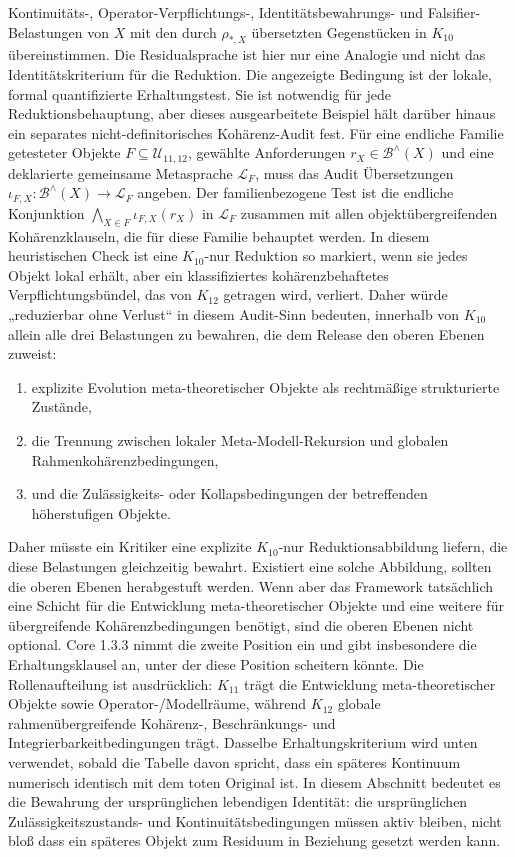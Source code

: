 Kontinuitäts-, Operator-Verpflichtungs-, Identitätsbewahrungs- und Falsifier-Belastungen von \(X\) mit den
durch \(\rho_{\ast,X}\) übersetzten Gegenstücken in \(K_{10}\) übereinstimmen. Die Residualsprache ist hier
nur eine Analogie und nicht das Identitätskriterium für die Reduktion. Die angezeigte Bedingung ist der
lokale, formal quantifizierte Erhaltungstest. Sie ist notwendig für jede Reduktionsbehauptung, aber dieses
ausgearbeitete Beispiel hält darüber hinaus ein separates nicht-definitorisches Kohärenz-Audit fest. Für eine
endliche Familie getesteter Objekte \(F\subseteq\mathcal{U}_{11,12}\), gewählte Anforderungen
\(r_X\in\mathcal{B}^{\wedge}(X)\) und eine deklarierte gemeinsame Metasprache \(\mathcal{L}_F\), muss das
Audit Übersetzungen\(\iota_{F,X}:
\mathcal{B}^{\wedge}(X)\to\mathcal{L}_F\)
angeben. Der familienbezogene Test ist die endliche Konjunktion
\(\bigwedge_{X\in F}\iota_{F,X}(r_X)\) in \(\mathcal{L}_F\) zusammen mit allen
objektübergreifenden Kohärenzklauseln, die für diese Familie behauptet werden. In diesem heuristischen
Check ist eine \(K_{10}\)-nur Reduktion so markiert, wenn sie jedes Objekt lokal erhält, aber ein
klassifiziertes kohärenzbehaftetes Verpflichtungsbündel, das von \(K_{12}\) getragen wird, verliert. Daher
würde „reduzierbar ohne Verlust“ in diesem Audit-Sinn bedeuten, innerhalb von \(K_{10}\) allein alle drei
Belastungen zu bewahren, die dem Release den oberen Ebenen zuweist:
\begin{enumerate}
\item explizite Evolution meta-theoretischer Objekte als rechtmäßige strukturierte Zustände,
\item die Trennung zwischen lokaler Meta-Modell-Rekursion und globalen Rahmenkohärenzbedingungen,
\item und die Zulässigkeits- oder Kollapsbedingungen der betreffenden höherstufigen Objekte.
\end{enumerate}
Daher müsste ein Kritiker eine explizite \(K_{10}\)-nur Reduktionsabbildung liefern, die diese Belastungen
gleichzeitig bewahrt. Existiert eine solche Abbildung, sollten die oberen Ebenen herabgestuft werden. Wenn
aber das Framework tatsächlich eine Schicht für die Entwicklung meta-theoretischer Objekte und eine weitere
für übergreifende Kohärenzbedingungen benötigt, sind die oberen Ebenen nicht optional. Core 1.3.3 nimmt die
zweite Position ein und gibt insbesondere die Erhaltungsklausel an, unter der diese Position scheitern
könnte.
Die Rollenaufteilung ist ausdrücklich: \(K_{11}\) trägt die Entwicklung meta-theoretischer Objekte sowie
Operator-/Modellräume, während \(K_{12}\) globale rahmenübergreifende Kohärenz-, Beschränkungs- und
Integrierbarkeitbedingungen trägt. Dasselbe Erhaltungskriterium wird unten verwendet, sobald die Tabelle
davon spricht, dass ein späteres Kontinuum numerisch identisch mit dem toten Original ist. In diesem
Abschnitt bedeutet es die Bewahrung der ursprünglichen lebendigen Identität: die ursprünglichen
Zulässigkeitszustands- und Kontinuitätsbedingungen müssen aktiv bleiben, nicht bloß dass ein späteres Objekt
zum Residuum in Beziehung gesetzt werden kann.

